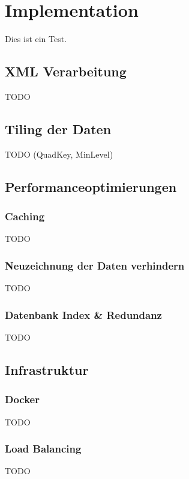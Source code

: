 
\chapter{Implementation}
Dies ist ein Test. \cite{Matthews201111}
\section{XML Verarbeitung}
\begin{flushleft}
TODO
\end{flushleft}
\section{Tiling der Daten}\label{sec:tilingdataimplementation}
\begin{flushleft}
TODO (QuadKey, MinLevel)
\end{flushleft}
\section{Performanceoptimierungen}
\subsection{Caching}
\begin{flushleft}
TODO
\end{flushleft}
\subsection{Neuzeichnung der Daten verhindern}
\begin{flushleft}
TODO
\end{flushleft}
\subsection{Datenbank Index \& Redundanz}
\begin{flushleft}
TODO
\end{flushleft}
\section{Infrastruktur}
\subsection{Docker}
\begin{flushleft}
TODO
\end{flushleft}
\subsection{Load Balancing}
\begin{flushleft}
TODO
\end{flushleft}